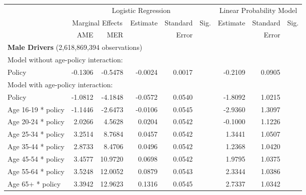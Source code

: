 
\begin{table}%
\centering 
\begin{tabular}{l r r r r l r r l} 

\hline 
 
 & \multicolumn{5}{c}{Logistic Regression}  & \multicolumn{3}{c}{Linear Probability Model} \\ 

 \cmidrule(lr){2-6}\cmidrule(lr){7-9} 
 & \multicolumn{2}{c}{Marginal Effects} & Estimate & Standard & Sig. & Estimate & Standard & Sig. \\ 

 \cmidrule(lr){2-3} 
 &   AME &  MER  &          &  Error   &      &          &  Error   &     \\ 

\hline 
 
\multicolumn{8}{l}{\textbf{Male Drivers} (2,618,869,394 observations)} \\ 

\hline
\multicolumn{8}{l}{Model without age-policy interaction: } \\ 
Policy                   &  -0.1306        &  -0.5478       &  -0.0024        &  0.0017       &            &  -0.2109        &  0.0905       &            \\ 
\hline
\multicolumn{8}{l}{Model with age-policy interaction: } \\ 
Policy                   &  -1.0812        &  -4.1848       &  -0.0572        &  0.0540       &            &  -1.8092        &  1.0215       &            \\ 
Age 16-19 * policy   &  -1.1446        &  -2.6473       &  -0.0106        &  0.0545       &            &  -2.9360        &  1.3097       &            \\ 
Age 20-24 * policy   &  2.0266        &  4.5628       &  0.0204        &  0.0542       &            &  -0.1000        &  1.1226       &            \\ 
Age 25-34 * policy   &  3.2514        &  8.7684       &  0.0457        &  0.0542       &            &  1.3441        &  1.0507       &            \\ 
Age 35-44 * policy   &  2.8733        &  8.4706       &  0.0496        &  0.0542       &            &  1.2368        &  1.0420       &            \\ 
Age 45-54 * policy   &  3.4577        &  10.9720       &  0.0698        &  0.0542       &            &  1.9795        &  1.0375       &            \\ 
Age 55-64 * policy   &  3.5248        &  12.0052       &  0.0879        &  0.0543       &            &  2.3344        &  1.0386       &            \\ 
Age 65+ * policy   &  3.3942        &  12.9623       &  0.1316        &  0.0545       &            &  2.7337        &  1.0342       &            \\ 


\end{tabular}
\end{table}

